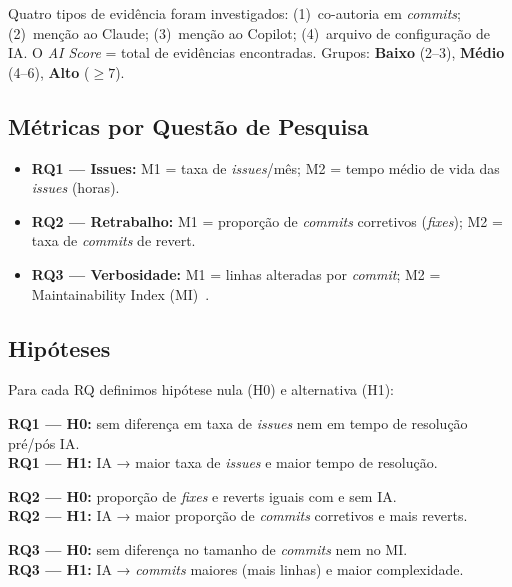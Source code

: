 \documentclass[12pt,a4paper,twocolumn]{article}
\begin{document}
Quatro tipos de evidência foram investigados: (1)~co-autoria em \textit{commits};
(2)~menção ao Claude; (3)~menção ao Copilot; (4)~arquivo de configuração de IA.
O \textit{AI Score} = total de evidências encontradas. Grupos: \textbf{Baixo}
(2--3), \textbf{Médio} (4--6), \textbf{Alto} ($\geq 7$).

\subsection{Métricas por Questão de Pesquisa}

\begin{itemize}[leftmargin=1.2em, itemsep=2pt, parsep=0pt, partopsep=0pt, topsep=2pt]
  \item \textbf{RQ1 — Issues:} M1 = taxa de \textit{issues}/mês; M2 = tempo
    médio de vida das \textit{issues} (horas).
  \item \textbf{RQ2 — Retrabalho:} M1 = proporção de \textit{commits}
    corretivos (\textit{fixes}); M2 = taxa de \textit{commits} de revert.
  \item \textbf{RQ3 — Verbosidade:} M1 = linhas alteradas por \textit{commit};
    M2 = Maintainability Index (MI)~\cite{oman1992maintainability}.
\end{itemize}

\subsection{Hipóteses}

Para cada RQ definimos hipótese nula (H0) e alternativa (H1):

\begin{hypbox}
\footnotesize
\textbf{RQ1 — H0:} sem diferença em taxa de \textit{issues} nem em tempo de resolução
pré/pós IA.\\
\textbf{RQ1 — H1:} IA → maior taxa de \textit{issues} e maior tempo de resolução.
\end{hypbox}

\begin{hypbox}
\footnotesize
\textbf{RQ2 — H0:} proporção de \textit{fixes} e reverts iguais com e sem IA.\\
\textbf{RQ2 — H1:} IA → maior proporção de \textit{commits} corretivos e mais reverts.
\end{hypbox}

\begin{hypbox}
\footnotesize
\textbf{RQ3 — H0:} sem diferença no tamanho de \textit{commits} nem no MI.\\
\textbf{RQ3 — H1:} IA → \textit{commits} maiores (mais linhas) e maior complexidade.
\end{hypbox}
\end{document}
